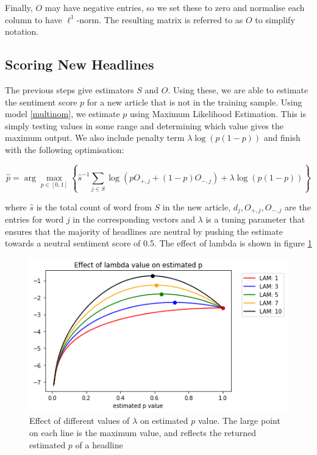 \noindent
Finally, $O$ may have negative entries, so we set these to zero and normalise each column to have $\ell^1$-norm. The resulting matrix is referred to as $O$ to simplify notation.

\subsection{Scoring New Headlines}
\label{new-headlines}

The previous steps give estimators $S$ and $O$. Using these, we are able to estimate the sentiment score $p$ for a new article that is not in the training sample. Using model \ref{multinom}, we estimate $p$ using Maximum Likelihood Estimation. This is simply testing values in some range and determining which value gives the maximum output. We also include penalty term $\lambda \log(p(1-p))$ and finish with the following optimisation:

\begin{equation}
\widehat p = \arg \max_{p \in [0,1]} \left\{ \widehat s^{-1} \sum_{j \in S} \log (p O_{+,j} + (1-p) O_{-,j}) + \lambda \log(p(1-p)) \right\}
\end{equation}

\noindent
where $\widehat s$ is the total count of word from $S$ in the new article, $d_j, O_{+,j}, O_{-,j}$ are the entries for word $j$ in the corresponding vectors and $\lambda$ is a tuning parameter that ensures that the majority of headlines are neutral by pushing the estimate towards a neutral sentiment score of 0.5. The effect of lambda is shown in figure \ref{fig:lam-effect}

\begin{figure}[!t]
    \begin{center}
        \includegraphics[scale=.75]{./pics/lam-effect.png}
        \caption[Effect of $\lambda$]{Effect of different values of $\lambda$ on estimated $p$ value. The large point on each line is the maximum value, and reflects the returned estimated $p$ of a headline}
        \label{fig:lam-effect}
    \end{center}
\end{figure}


